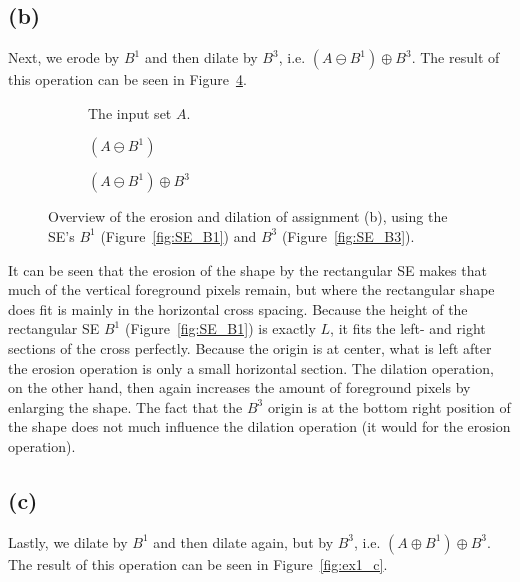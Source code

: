 \documentclass{article}
\begin{document}
\subsection*{(b)} Next, we erode by $B^1$ and then dilate by $B^3$, i.e. $(A \ominus B^1) \oplus B^3$. The result of this operation can be seen in Figure~\ref{fig:ex1_b}.

\begin{figure}[H]
     \centering
     \begin{subfigure}[b]{0.28\textwidth}
         \centering
         
         \caption{The input set $A$.}
         \label{fig:ex1_b-inputset}
     \end{subfigure}
     \hfill
     \begin{subfigure}[b]{0.29\textwidth}
         \centering
         
         \caption{$(A \ominus B^1)$}
         \label{fig:ex1_b-step1}
     \end{subfigure}
     \hfill
     \begin{subfigure}[b]{0.37\textwidth}
         \centering
         
         \caption{$(A \ominus B^1) \oplus B^3$}
         \label{fig:ex1_b-step2}
     \end{subfigure}
     
    \caption{Overview of the erosion and dilation of assignment (b), using the SE's $B^1$ (Figure~\ref{fig:SE_B1}) and $B^3$ (Figure~\ref{fig:SE_B3}).}
    \label{fig:ex1_b}
\end{figure}

It can be seen that the erosion of the shape by the rectangular SE makes that much of the vertical foreground pixels remain, but where the rectangular shape does fit is mainly in the horizontal cross spacing. Because the height of the rectangular SE $B^1$ (Figure~\ref{fig:SE_B1}) is exactly $L$, it fits the left- and right sections of the cross perfectly. Because the origin is at center, what is left after the erosion operation is only a small horizontal section. The dilation operation, on the other hand, then again increases the amount of foreground pixels by enlarging the shape. The fact that the $B^3$ origin is at the bottom right position of the shape does not much influence the dilation operation (it would for the erosion operation).

\subsection*{(c)} Lastly, we dilate by $B^1$ and then dilate again, but by $B^3$, i.e. $(A \oplus B^1) \oplus B^3$. The result of this operation can be seen in Figure~\ref{fig:ex1_c}.
\end{document}
